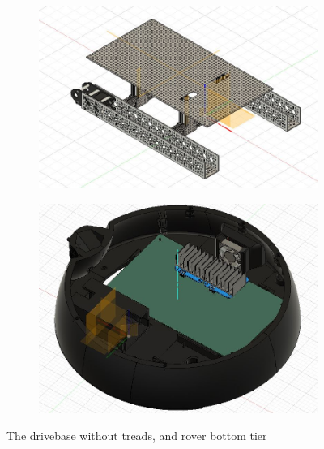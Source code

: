 \documentclass[a4paper, 10pt]{article}
\begin{document}
		\begin{figure}[h]
			\centering
			\begin{subfigure}[h]{0.44\textwidth}
				\centering
				\includegraphics[width=\textwidth]{Photos/rover_drivebase}
			\end{subfigure}
			\hfill
			\begin{subfigure}[h]{0.55\textwidth}
				\centering
				\includegraphics[width=\textwidth]{Photos/rover_bottom}
				
			\end{subfigure}
			\centering
			\caption{The drivebase without treads, and rover bottom tier}
			\label{bottom_parts}
		\end{figure}
\end{document}
